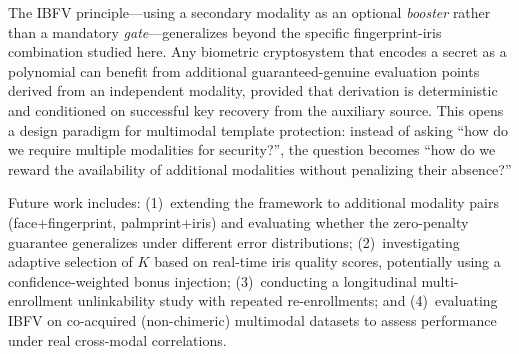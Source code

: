 \documentclass[conference]{IEEEtran}
\newcommand{\IBFV}{\textsf{IBFV}}
\begin{document}
The \IBFV{} principle---using a secondary modality as an optional \emph{booster} rather than a mandatory \emph{gate}---generalizes beyond the specific fingerprint-iris combination studied here. Any biometric cryptosystem that encodes a secret as a polynomial can benefit from additional guaranteed-genuine evaluation points derived from an independent modality, provided that derivation is deterministic and conditioned on successful key recovery from the auxiliary source. This opens a design paradigm for multimodal template protection: instead of asking ``how do we require multiple modalities for security?'', the question becomes ``how do we reward the availability of additional modalities without penalizing their absence?''

Future work includes: (1)~extending the framework to additional modality pairs (face+fingerprint, palmprint+iris) and evaluating whether the zero-penalty guarantee generalizes under different error distributions; (2)~investigating adaptive selection of $K$ based on real-time iris quality scores, potentially using a confidence-weighted bonus injection; (3)~conducting a longitudinal multi-enrollment unlinkability study with repeated re-enrollments; and (4)~evaluating \IBFV{} on co-acquired (non-chimeric) multimodal datasets to assess performance under real cross-modal correlations.

\balance


\end{document}
